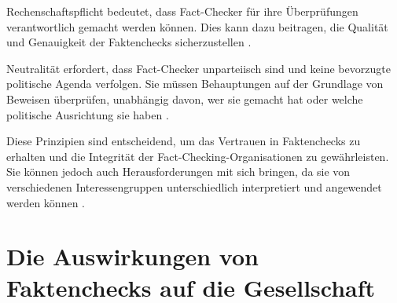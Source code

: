 \documentclass[a4paper,listof=totoc,bibliography=totoc]{scrartcl}
\begin{document}
Rechenschaftspflicht bedeutet, dass Fact-Checker für ihre Überprüfungen verantwortlich gemacht werden können. Dies kann dazu beitragen, die Qualität und Genauigkeit der Faktenchecks sicherzustellen \cite{amazeen2018}.

Neutralität erfordert, dass Fact-Checker unparteiisch sind und keine bevorzugte politische Agenda verfolgen. Sie müssen Behauptungen auf der Grundlage von Beweisen überprüfen, unabhängig davon, wer sie gemacht hat oder welche politische Ausrichtung sie haben \cite{graves2016}.

Diese Prinzipien sind entscheidend, um das Vertrauen in Faktenchecks zu erhalten und die Integrität der Fact-Checking-Organisationen zu gewährleisten. Sie können jedoch auch Herausforderungen mit sich bringen, da sie von verschiedenen Interessengruppen unterschiedlich interpretiert und angewendet werden können \cite{nyhan2010}.

\section{Die Auswirkungen von Faktenchecks auf die Gesellschaft}
\end{document}
